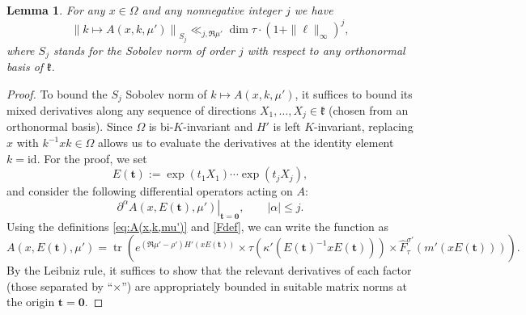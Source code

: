 \documentclass[11pt,oneside]{amsart}
\numberwithin{equation}{section}
\theoremstyle{remark}
\theoremstyle{plain}
\newtheorem{lemma}{Lemma}
\DeclareMathOperator{\tr}{tr}
\newcommand\id{\mathrm{id}}
\newcommand\mfk{\mathfrak{k}}
\newcommand{\bt}{\mathbf{t}}
\renewcommand\leq{\leqslant}
\begin{document}
\begin{lemma}\label{lemma:sobolev} For any $x\in\Omega$ and any nonnegative integer $j$ we have
\begin{equation}\label{eq:lemma12bound}
\left\|k\mapsto A(x,k,\mu')\right\|_{S_j}\ll_{j,\Re\mu'} \dim \tau \cdot (1+\|\bm\ell\|_{\infty})^{j},
\end{equation}
where $S_j$ stands for the Sobolev norm of order $j$ with respect to any orthonormal basis of $\mfk$.
\end{lemma}
\begin{proof} 
To bound the $S_j$ Sobolev norm of $k \mapsto A(x, k, \mu')$, it suffices to bound its mixed derivatives along any sequence of directions $X_1,\dotsc,X_j \in \mfk$ (chosen from an orthonormal basis). Since $\Omega$ is bi-$K$-invariant and $H'$ is left $K$-invariant, replacing $x$ with $k^{-1}xk \in \Omega$ allows us to evaluate the derivatives at the identity element $k = \id$. For the proof, we set
\[
E(\bt):=\exp(t_1X_1)\dotsb\exp(t_jX_j),
\]
and consider the following differential operators acting on $A$:
\[ \left. \partial^{\alpha} A(x, E(\bt), \mu') \right|_{\bt=\mathbf{0}}, \qquad |\alpha|\leq j.\]
Using the definitions \eqref{eq:A(x,k,mu')} and \eqref{Fdef}, we can write the function as
\[
A(x, E(\bt),\mu') = \tr \left(e^{(\Re\mu' - \rho')H'(x E(\bt))} \times \tau(\kappa'(E(\bt)^{-1} x E(\bt))) \times \hat{F}_\tau^{\sigma'}(m'(x E(\bt))) \right).
\]
By the Leibniz rule, it suffices to show that the relevant derivatives of each factor (those separated by ``$\times$'') are appropriately bounded in suitable matrix norms at the origin $\bt=\mathbf{0}$.


\end{proof}
\end{document}

